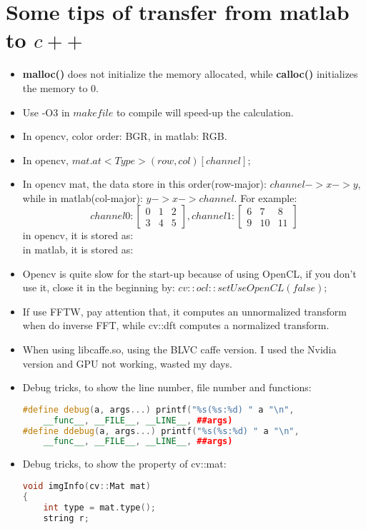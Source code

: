 \documentclass[12pt]{article}
\numberwithin{equation}{section}
\begin{document}
{\section{Some tips of transfer from matlab to $c++$}
\begin{itemize}
	\item \textbf{malloc()} does not initialize the memory allocated, while \textbf{calloc()} initializes the memory to 0.
	\item Use -O3 in $makefile$ to compile will speed-up the calculation. 
	\item In opencv, color order: BGR, in matlab: RGB.
	\item In opencv, $mat.at<Type>(row, col)[channel]$;
	\item In opencv mat, the data store in this order(row-major): $channel -> x-> y$, while in matlab(col-major): $y->x->channel$. For example:
	\begin{equation}
		channel 0:
		\begin{bmatrix}
		0 & 1 & 2 \\
		3 & 4 & 5
		\end{bmatrix}, 
		channel 1:
		\begin{bmatrix}
		6 & 7 & 8 \\
		9 & 10 & 11
		\end{bmatrix}
	\end{equation}
	in opencv, it is stored as:
	\begin{equation}
		[0, 6, 1, 7, 2, 8, 3, 9, 4, 10, 5, 11]
	\end{equation}
	in matlab, it is stored as:
	\begin{equation}
		[0, 3, 1, 4, 2, 5, 6, 9, 7, 10, 8, 11]
	\end{equation}
	\item Opencv is quite slow for the start-up because of using OpenCL, if you don't use it, close it in the beginning by: $cv::ocl::setUseOpenCL(false);$
	\item If use FFTW, pay attention that, it computes an unnormalized transform when do inverse FFT, while cv::dft computes a normalized transform.
	\item When using libcaffe.so, using the BLVC caffe version. I used the Nvidia version and GPU 
	not working, wasted my days.
	\item Debug tricks, to show the line number, file number and functions:
		\begin{lstlisting}[language=C++]
#define debug(a, args...) printf("%s(%s:%d) " a "\n", 
	__func__, __FILE__, __LINE__, ##args)
#define ddebug(a, args...) printf("%s(%s:%d) " a "\n", 
	__func__, __FILE__, __LINE__, ##args)
		\end{lstlisting}
	\item Debug tricks, to show the property of cv::mat:
		\begin{lstlisting}[language=C++]
void imgInfo(cv::Mat mat)
{
	int type = mat.type();
	string r;


\end{lstlisting}
\end{itemize}}
\end{document}

